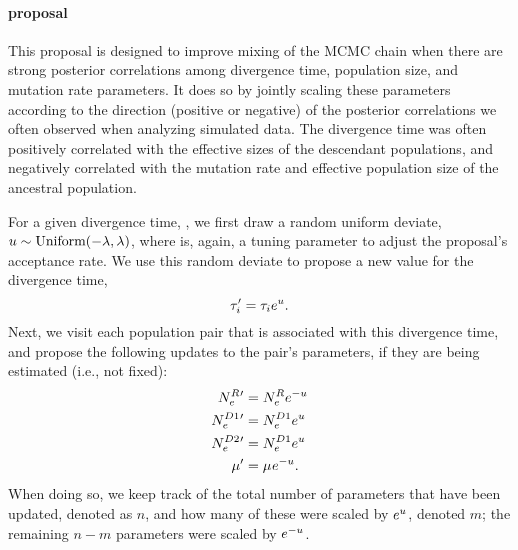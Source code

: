 \paragraph{\timesizeratemixer proposal}
This proposal is designed to improve mixing of the MCMC chain when there are
strong posterior correlations among divergence time, population size, and
mutation rate parameters.
It does so by jointly scaling these parameters according to the direction
(positive or negative) of the posterior correlations we often observed when
analyzing simulated data.
The divergence time was often positively correlated with the effective sizes of
the descendant populations, and negatively correlated with the mutation rate
and effective population size of the ancestral population.

\begin{linenomath}
For a given divergence time, \divtime[i],
we first draw a random uniform deviate,
$\uniformdeviate \sim \textrm{Uniform}(-\tuningparameter, \tuningparameter)$,
where \tuningparameter is, again, a tuning parameter to adjust the proposal's
acceptance rate.
We use this random deviate to propose a new value for the divergence time,
\[
    \divtime[i]\proposed = \divtime[i] e^{\uniformdeviate}.
\]
Next, we visit each population pair that is associated with this
divergence time, and propose the following updates to the
pair's parameters, if they are being estimated (i.e., not fixed):
\begin{equation}
    \begin{split}
        \epopsize[\rootpopindex]{}\proposed & = \epopsize[\rootpopindex]{} e^{-\uniformdeviate} \\
        \epopsize[\descendantpopindex{1}]{}\proposed & = \epopsize[\descendantpopindex{1}]{} e^{\uniformdeviate} \\
        \epopsize[\descendantpopindex{2}]{}\proposed & = \epopsize[\descendantpopindex{1}]{} e^{\uniformdeviate} \\
        \murate\proposed & = \murate e^{-\uniformdeviate}.
    \end{split}
\end{equation}
When doing so, we keep track of the total number of parameters
that have been updated, denoted as $n$,
and how many of these were scaled by
$e^{\uniformdeviate}$, denoted $m$;
the remaining $n-m$ parameters were scaled by $e^{-\uniformdeviate}$.
\end{linenomath}

